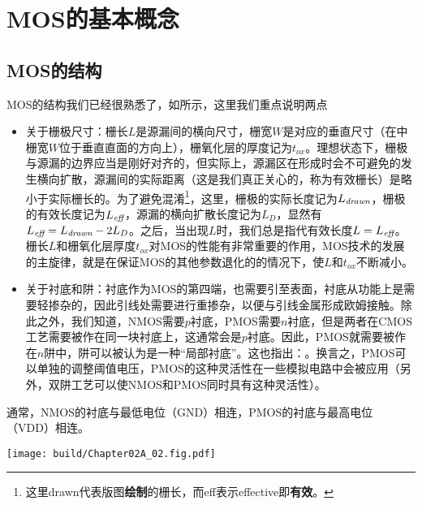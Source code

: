 \section{MOS的基本概念}

\subsection{MOS的结构}
MOS的结构我们已经很熟悉了，如所示，这里我们重点说明两点
\begin{itemize}
    \item 关于栅极尺寸：栅长$L$是源漏间的横向尺寸，栅宽$W$是对应的垂直尺寸（在中栅宽$W$位于垂直直面的方向上），栅氧化层的厚度记为$t_{ox}$。理想状态下，栅极与源漏的边界应当是刚好对齐的，但实际上，源漏区在形成时会不可避免的发生横向扩散，源漏间的实际距离（这是我们真正关心的，称为有效栅长）是略小于实际栅长的。为了避免混淆\footnote{这里drawn代表版图\textbf{绘制}的栅长，而eff表示effective即\textbf{有效}。}，这里，栅极的实际长度记为$L_{\textit{drawn}}$，栅极的有效长度记为$L_{\textit{eff}}$，源漏的横向扩散长度记为$L_{D}$，显然有$L_{\textit{eff}}=L_{\textit{drawn}}-2L_{D}$。之后，当出现$L$时，我们总是指代有效长度$L=L_{\textit{eff}}$。栅长$L$和栅氧化层厚度$t_{ox}$对MOS的性能有非常重要的作用，MOS技术的发展的主旋律，就是在保证MOS的其他参数退化的的情况下，使$L$和$t_{ox}$不断减小。
    \item 关于衬底和阱：衬底作为MOS的第四端，也需要引至表面，衬底从功能上是需要轻掺杂的，因此引线处需要进行重掺杂，以便与引线金属形成欧姆接触。除此之外，我们知道，NMOS需要$p$衬底，PMOS需要$n$衬底，但是两者在CMOS工艺需要被作在同一块衬底上，这通常会是$p$衬底。因此，PMOS就需要被作在$n$阱中，阱可以被认为是一种“局部衬底”。这也指出：。换言之，PMOS可以单独的调整阈值电压，PMOS的这种灵活性在一些模拟电路中会被应用（另外，双阱工艺可以使NMOS和PMOS同时具有这种灵活性）。
\end{itemize}

通常，NMOS的衬底与最低电位（GND）相连，PMOS的衬底与最高电位（VDD）相连。

\begin{Figure}[MOS的结构]
    \texttt{[image: build/Chapter02A\_02.fig.pdf]}
\end{Figure}

